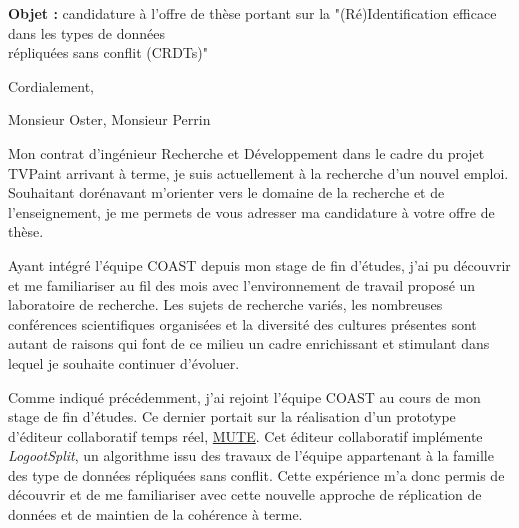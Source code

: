 \documentclass[11pt,a4paper,sans]{moderncv}        %
\newcommand{\customboldlink}[1]{\color{href} #1}
\newcommand{\tab}{\quad \quad}
\begin{document}
\date{À Nancy, le 21 mai 2017}
\opening{
  \textbf{Objet :} candidature à l'offre de thèse portant sur la "(Ré)Identification efficace dans les types de données\\
  \hspace{13mm}    répliquées sans conflit (CRDTs)"
}
\closing{Cordialement,}
\makelettertitle

Monsieur Oster, Monsieur Perrin

\justify
\tab Mon contrat d'ingénieur Recherche et Développement dans le cadre du projet TVPaint arrivant à terme,
je suis actuellement à la recherche d'un nouvel emploi.
Souhaitant dorénavant m'orienter vers le domaine de la recherche et de l'enseignement,
je me permets de vous adresser ma candidature à votre offre de thèse.

%
%
\tab Ayant intégré l'équipe COAST depuis mon stage de fin d'études,
j'ai pu découvrir et me familiariser au fil des mois avec l'environnement de travail proposé un laboratoire de recherche.
Les sujets de recherche variés, les nombreuses conférences scientifiques organisées
et la diversité des cultures présentes sont autant de raisons
qui font de ce milieu un cadre enrichissant et stimulant dans lequel je souhaite continuer d'évoluer.

%
%
\tab Comme indiqué précédemment, j'ai rejoint l'équipe COAST au cours de mon stage de fin d'études.
Ce dernier portait sur la réalisation d'un prototype d'éditeur collaboratif temps réel,
\href{https://www.coedit.re}{\customboldlink MUTE}.
Cet éditeur collaboratif implémente \emph{LogootSplit},
un algorithme issu des travaux de l'équipe appartenant à la famille des type de données répliquées sans conflit.
Cette expérience m'a donc permis de découvrir
et de me familiariser avec cette nouvelle approche
de réplication de données et de maintien de la cohérence à terme.
\end{document}
